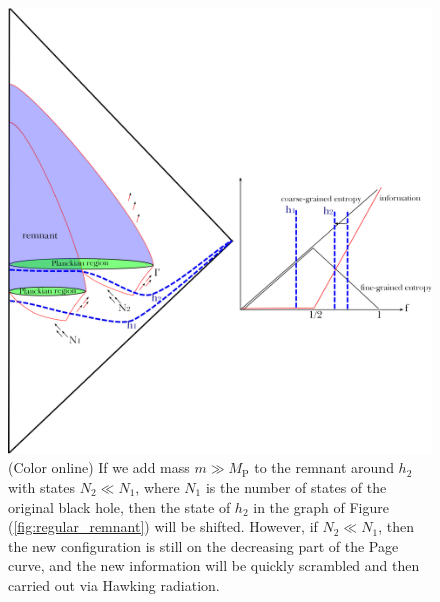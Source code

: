 \documentclass[12pt]{article}
\newcommand{\2}{$^2$}
\newcommand{\3}{$^3$}
\newcommand{\4}{$_4$}
\newcommand{\5}{$_5$}
\begin{document}
\begin{figure}
\begin{center}
\includegraphics[scale=0.45]{regular_remnant_duplication-eps-converted-to.pdf}
\caption{\label{fig:regular_remnant_duplication}(Color online) If we add mass $m \gg M_{\text{P}}$ to the remnant around $h_{2}$ with states $N_{2} \ll N_{1}$, where $N_{1}$ is the number of states of the original black hole, then the state of $h_{2}$ in the graph of Figure (\ref{fig:regular_remnant}) will be shifted. However, if $N_{2} \ll N_{1}$, then the new configuration is still on the decreasing part of the Page curve, and the new information will be quickly scrambled and then carried out via Hawking radiation.}
\end{center}
\end{figure}
\end{document}
